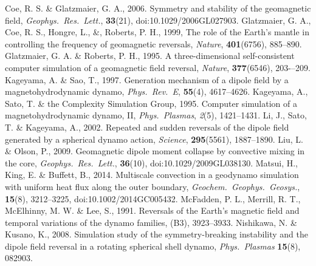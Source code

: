 \begin{thebibliography}{}
%
Coe, R. S. \& Glatzmaier, G. A., 2006. Symmetry and stability of the geomagnetic field, {\it Geophys.\  Res.\ Lett.}, {\bf 33}(21),  doi:10.1029/2006GL027903.
%
Glatzmaier, G. A., Coe, R. S., Hongre, L., \&, Roberts, P. H., 1999, The role of the Earth's mantle in controlling the frequency of geomagnetic reversals, {\it Nature}, {\bf 401}(6756),  885--890.
%
Glatzmaier, G. A. \& Roberts, P. H., 1995. A three-dimensional self-consistent computer simulation of a geomagnetic field reversal, {\it Nature}, {\bf 377}(6546), 203-–209.
%
Kageyama, A. \& Sao, T., 1997. Generation mechanism of a dipole field by a magnetohydrodynamic dynamo, {\it Phys.\ Rev.\ E}, {\bf 55}(4), 4617--4626.
%
Kageyama, A., Sato, T. \& the Complexity Simulation Group, 1995. Computer simulation of a magnetohydrodynamic dynamo, II, {\it Phys.\ Plasmas}, {\it 2}(5), 1421--1431.
%
Li, J., Sato, T. \& Kageyama, A., 2002. Repeated and sudden reversals of the dipole field generated by a spherical dynamo action, {\it Science}, {\bf 295}(5561), 1887--1890.
%
Liu, L. \& Olson, P., 2009. Geomagnetic dipole moment collapse by convective mixing in the core, {\it Geophys.\ Res.\ Lett.}, {\bf 36}(10), doi:10.1029/2009GL038130.
%
Matsui, H., King, E. \& Buffett, B., 2014. Multiscale convection in a geodynamo simulation with uniform heat flux along the outer boundary, {\it Geochem.\ Geophys.\ Geosys.}, {\bf 15}(8), 3212--3225, doi:10.1002/2014GC005432.
%
McFadden, P. L., Merrill, R. T., McElhinny, M. W. \& Lee, S., 1991. Reversals of the Earth's magnetic field and temporal variations of the dynamo families, (B3), 3923--3933.
%
Nishikawa, N. \& Kusano, K., 2008. Simulation study of the symmetry-breaking instability and the dipole field reversal in a rotating spherical shell dynamo, {\it Phys.\ Plasmas} {\bf 15}(8), 082903.
%

\end{thebibliography}

